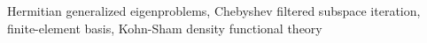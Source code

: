 \documentclass[preprint,3p,number,sort&compress]{elsarticle}
\begin{document}
\begin{frontmatter}

\begin{keyword}


Hermitian generalized eigenproblems, Chebyshev filtered subspace iteration, finite-element basis, Kohn-Sham density functional theory 
\end{keyword}

\end{frontmatter}



\end{document}
